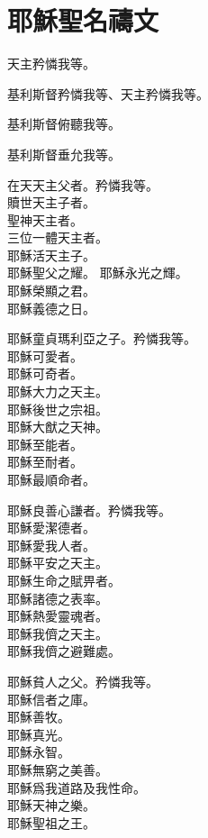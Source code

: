 \section{耶穌聖名禱文}
\versicle 天主矜憐我等。

\Response 基利斯督矜憐我等、\hfill 天主矜憐我等。

\versicle 基利斯督俯聽我等。

\Response 基利斯督垂允我等。

\versicle  在天天主父者。\hfill \response 矜憐我等。\\
贖世天主子者。\\
聖神天主者。\\
三位一體天主者。\\
耶穌活天主子。\\
耶穌聖父之耀。
耶穌永光之輝。\\
耶穌榮顯之君。\\
耶穌義德之日。

\versicle 耶穌童貞瑪利亞之子。\hfill \response 矜憐我等。\\
耶穌可愛者。\\
耶穌可奇者。\\
耶穌大力之天主。\\
耶穌後世之宗祖。\\
耶穌大猷之天神。\\
耶穌至能者。\\
耶穌至耐者。\\
耶穌最順命者。

\versicle 耶穌良善心謙者。\hfill \response 矜憐我等。\\
耶穌愛潔德者。\\
耶穌愛我人者。\\
耶穌平安之天主。\\
耶穌生命之賦畀者。\\
耶穌諸德之表率。\\
耶穌熱愛靈魂者。\\
耶穌我儕之天主。\\
耶穌我儕之避難處。

\versicle 耶穌貧人之父。\hfill \response 矜憐我等。\\ 
耶穌信者之庫。\\
耶穌善牧。\\
耶穌真光。\\
耶穌永智。\\
耶穌無窮之美善。\\
耶穌爲我道路及我性命。\\
耶穌天神之樂。\\
耶穌聖祖之王。


